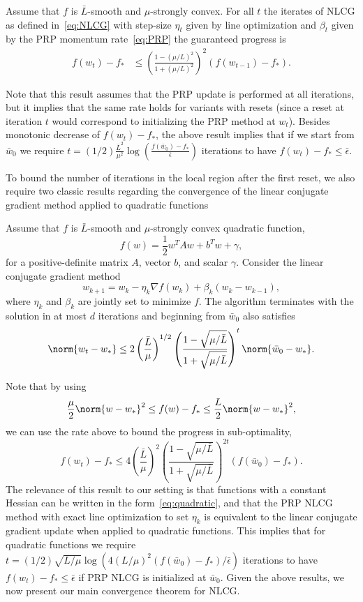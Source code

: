\documentclass[10pt]{article} %
\begin{document}
\begin{lemma}
\label{lem:NLCG}
Assume that $f$ is $\bar{L}$-smooth and $\mu$-strongly convex. For all $t$ the iterates of NLCG as defined in~\eqref{eq:NLCG} with step-size $\eta_t$ given by line optimization and $\beta_t$ given by the PRP momentum rate~\eqref{eq:PRP} the guaranteed progress is
    \begin{align*}
        f(w_{t}) - f_*
        &\leq \left(\frac{1 - (\mu/L)^2}{1+(\mu/L)^2}\right)^2(f(w_{t-1}) - f_*).
    \end{align*}
\end{lemma}
Note that this result assumes that the PRP update is performed at all iterations, but it implies that the same rate holds for variants with resets (since a reset at iteration $t$ would correspond to initializing the PRP method at $w_t$).
Besides monotonic decrease of $f(w_t)-f_*$, the above result implies that if we start from $\bar{w}_0$ we require $t = (1/2)\frac{\bar{L}^2}{\mu^2}\log\left(\frac{f(\bar{w}_0)-f_*}{\bar{\epsilon}}\right)$ iterations to have $f(w_t) - f_* \leq \bar{\epsilon}$.

To bound the number of iterations in the local region after the first reset, we also require two classic results regarding the convergence of the linear conjugate gradient method applied to quadratic functions~\cite[Section~3.2.2]{polyak1987introduction}
\begin{lemma}
\label{lem:CG}
Assume that $f$ is $\bar{L}$-smooth and $\mu$-strongly convex quadratic function,
\begin{equation}
f(w) = \frac 1 2 w^TAw + b^Tw + \gamma,
\label{eq:quadratic}
\end{equation}
for a positive-definite matrix $A$, vector $b$, and scalar $\gamma$. Consider the linear conjugate gradient method
\[
w_{k+1} = w_k - \eta_k\nabla f(w_k) + \beta_k(w_k - w_{k-1}),
\]
where $\eta_k$ and $\beta_k$ are jointly set to minimize $f$.
The algorithm terminates with the solution in at most $d$ iterations and beginning from $\bar{w}_0$ also satisfies
    \begin{align*}
    \norm{w_t - w_*} \leq 2\left(\frac{\bar{L}}{\mu}\right)^{1/2}\left(\frac{1-\sqrt{\mu/\bar{L}}}{1+\sqrt{\mu/\bar{L}}}\right)^t\norm{\bar{w}_0-w_*}.
    \end{align*}
\end{lemma}
Note that by using
\[
\frac{\mu}{2}\norm{w - w_*}^2 \leq f(w) - f_* \leq \frac{L}{2}\norm{w-w_*}^2,
\]
we can use the rate above to bound the progress in sub-optimality,
\[
f(w_t) - f_* \leq 4\left(\frac{\bar{L}}{\mu}\right)^2\left(\frac{1-\sqrt{\mu/\bar{L}}}{1+\sqrt{\mu/\bar{L}}}\right)^{2t}(f(\bar{w}_0) - f_*).
\]
The relevance of this result to our setting is that functions with a constant Hessian can be written in the form~\eqref{eq:quadratic}, and that the PRP NLCG method with exact line optimization to set $\eta_k$ is equivalent to the linear conjugate gradient update when applied to quadratic functions. This implies that for quadratic functions we require $t = (1/2)\sqrt{L/\mu}\log(4(L/\mu)^2(f(\bar{w}_0) - f_*)/\bar{\epsilon})$ iterations to have $f(w_t) - f_* \leq \bar{\epsilon}$ if PRP NLCG is initialized at $\bar{w}_0$. Given the above results, we now present our main convergence theorem for NLCG.
\end{document}
